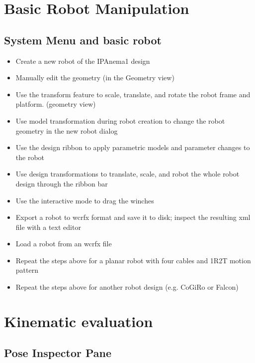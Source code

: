 \section{Basic Robot Manipulation}
\subsection{System Menu and basic robot}

\begin{itemize}
\item  {Create a new robot of the IPAnema1 design}
\item  {Manually edit the geometry (in the Geometry view)}
\item  {Use the transform feature to scale, translate, and rotate the robot frame and platform. (geometry view)}
\item  {Use model transformation during robot creation to change the robot geometry in the new robot dialog}
\item  {Use the design ribbon to apply parametric models and
  parameter changes to the
  robot}
\item  {Use design transformations to translate, scale, and
  robot the whole robot design through the ribbon
  bar}
\item  {Use the interactive mode to drag the winches}
\item  {Export a robot to wcrfx format and save it to disk;
  inspect the resulting xml file with a text
  editor}
\end{itemize}

\begin{itemize}
\item  {Load a robot from an wcrfx file}
\item  {Repeat the steps above for a planar robot with four
  cables and 1R2T motion
  pattern}
\item  {Repeat the steps above for another robot design (e.g.
  CoGiRo or
  Falcon)}
\end{itemize}

\section{Kinematic evaluation}
\subsection{Pose Inspector Pane}

